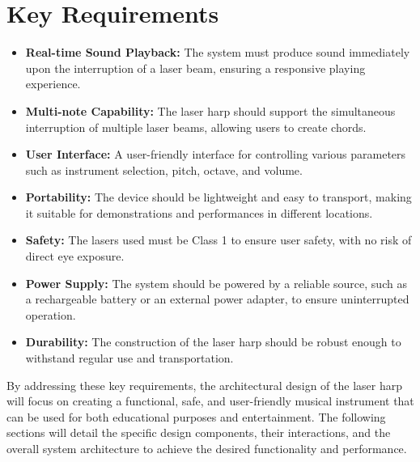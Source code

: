 \section{Key Requirements}

\begin{itemize}
    \item \textbf{Real-time Sound Playback:} The system must produce sound immediately upon the interruption of a laser beam, ensuring a responsive playing experience.
    \item \textbf{Multi-note Capability:} The laser harp should support the simultaneous interruption of multiple laser beams, allowing users to create chords.
    \item \textbf{User Interface:} A user-friendly interface for controlling various parameters such as instrument selection, pitch, octave, and volume.
    \item \textbf{Portability:} The device should be lightweight and easy to transport, making it suitable for demonstrations and performances in different locations.
    \item \textbf{Safety:} The lasers used must be Class 1 to ensure user safety, with no risk of direct eye exposure.
    \item \textbf{Power Supply:} The system should be powered by a reliable source, such as a rechargeable battery or an external power adapter, to ensure uninterrupted operation.
    \item \textbf{Durability:} The construction of the laser harp should be robust enough to withstand regular use and transportation.
\end{itemize}

By addressing these key requirements, the architectural design of the laser harp will focus on creating a functional, safe, and user-friendly musical instrument that can be used for both educational purposes and entertainment. The following sections will detail the specific design components, their interactions, and the overall system architecture to achieve the desired functionality and performance.
